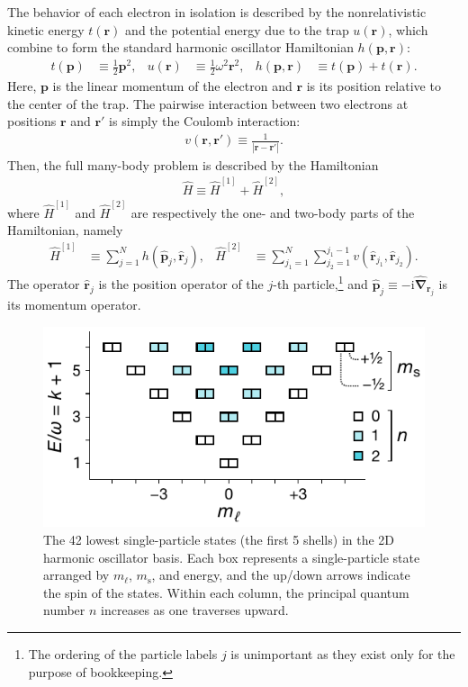 The behavior of each electron in isolation is described by the nonrelativistic kinetic energy $t(\bm{r})$ and the potential energy due to the trap $u(\bm{r})$, which combine to form the standard harmonic oscillator Hamiltonian $h(\bm{p}, \bm{r})$:
\begin{align*}
  t(\bm{p}) &\equiv \frac{1}{2} \bm{p}^2, &
  u(\bm{r}) &\equiv \frac{1}{2} \omega^2 \bm{r}^2, &
  h(\bm{p}, \bm{r}) &\equiv t(\bm{p}) + t(\bm{r}).
\end{align*}
Here, $\bm{p}$ is the linear momentum of the electron and $\bm{r}$ is its position relative to the center of the trap.  The pairwise interaction between two electrons at positions $\bm{r}$ and $\bm{r}'$ is simply the Coulomb interaction:
\begin{align*}
  v(\bm{r}, \bm{r}') \equiv \frac{1}{|\bm{r} - \bm{r}'|}.
\end{align*}
Then, the full many-body problem is described by the Hamiltonian
\begin{align*}
  \hat H \equiv \hat H^{[1]} + \hat H^{[2]},
\end{align*}
where $\hat{H}^{[1]}$ and $\hat{H}^{[2]}$ are respectively the one- and two-body parts of the Hamiltonian, namely
\begin{align} \label{eq:onetwobodyhamiltonian}
\hat{H}^{[1]} &\equiv \sum_{j = 1}^N h(\hat{\bm p}_j, \hat{\bm r}_j), &
\hat{H}^{[2]} &\equiv \sum_{j_1 = 1}^N \sum_{j_2 = 1}^{j_1 - 1} v(\hat{\bm r}_{j_1}, \hat{\bm r}_{j_2}).
\end{align}
The operator $\hat{\bm r}_j$ is the position operator of the $j$-th particle,\footnote{The ordering of the particle labels $j$ is unimportant as they exist only for the purpose of bookkeeping.} and $\hat{\bm p}_j \equiv -\mathrm{i} \hat{\bm{\nabla}}_{\bm{r}_j}$ is its momentum operator.

\begin{figure}
  \includegraphics{figures/fig-shell-structure-v2.pdf}
  \caption{The 42 lowest single-particle states (the first 5 shells) in the 2D harmonic oscillator basis.  Each box represents a single-particle state arranged by $m_\ell$, $m_{\mathrm{s}}$, and energy, and the up/down arrows indicate the spin of the states.  Within each column, the principal quantum number $n$ increases as one traverses upward.}
  \label{fig:shell-structure}
\end{figure}

